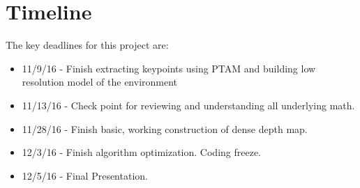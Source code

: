 \section{Timeline}

The key deadlines for this project are:
\begin{itemize}
\item 11/9/16 - Finish extracting keypoints using PTAM and building low resolution model of the environment
\item 11/13/16 - Check point for reviewing and understanding all underlying math. 
\item 11/28/16 - Finish basic, working construction of dense depth map.
\item 12/3/16 - Finish algorithm optimization. Coding freeze. 
\item 12/5/16 - Final Presentation.
\end{itemize}
